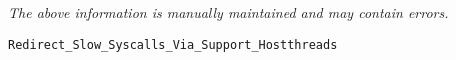 \label{pkg:redirect\_slow\_syscalls\_via\_support\_hostthreads}

{\tiny \it The above information is manually maintained and may contain errors.}
\begin{verbatim}
Redirect_Slow_Syscalls_Via_Support_Hostthreads
\end{verbatim}
